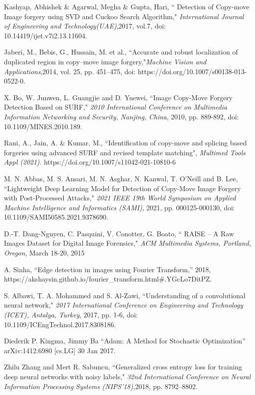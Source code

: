 \documentclass[conference]{IEEEtran}
\begin{document}
\begin{thebibliography}{00}
Kashyap, Abhishek \& Agarwal, Megha \& Gupta, Hari, “ Detection of Copy-move Image forgery using SVD and Cuckoo Search Algorithm," \textit{International Journal of Engineering and Technology(UAE)},2017, vol.7, doi: 10.14419/ijet.v7i2.13.11604. 

Jaberi, M., Bebis, G., Hussain, M. et al., “Accurate and robust localization of duplicated region in copy–move image forgery,"\textit{Machine Vision and Applications},2014, vol. 25, pp. 451–475, doi: https://doi.org/10.1007/s00138-013-0522-0.

X. Bo, W. Junwen, L. Guangjie and D. Yuewei, “Image Copy-Move Forgery Detection Based on SURF," \textit{2010 International Conference on Multimedia Information Networking and Security, Nanjing, China}, 2010, pp. 889-892, doi: 10.1109/MINES.2010.189.

Rani, A., Jain, A. \& Kumar, M., “Identification of copy-move and splicing based forgeries using advanced SURF and revised template matching",\textit{ Multimed Tools Appl (2021)}. https://doi.org/10.1007/s11042-021-10810-6

M. N. Abbas, M. S. Ansari, M. N. Asghar, N. Kanwal, T. O'Neill and B. Lee, “Lightweight Deep Learning Model for Detection of Copy-Move Image Forgery with Post-Processed Attacks," \textit{2021 IEEE 19th World Symposium on Applied Machine Intelligence and Informatics (SAMI)}, 2021, pp. 000125-000130, doi: 10.1109/SAMI50585.2021.9378690.

D.-T. Dang-Nguyen, C. Pasquini, V. Conotter, G. Boato, “ RAISE – A Raw Images Dataset for Digital Image Forensics,"\textit{ ACM Multimedia Systems, Portland, Oregon}, March 18-20, 2015

A. Sinha, “Edge detection in images using Fourier Transform,” 2018, https://akshaysin.github.io/fourier\_transform.html\#.YGcLo7DitPZ.

S. Albawi, T. A. Mohammed and S. Al-Zawi, “Understanding of a convolutional neural network," \textit{2017 International Conference on Engineering and Technology (ICET), Antalya, Turkey}, 2017, pp. 1-6, doi: 10.1109/ICEngTechnol.2017.8308186.

Diederik P. Kingma, Jimmy Ba “Adam: A Method for Stochastic Optimization” arXiv:1412.6980 [cs.LG] 30 Jan 2017.

Zhilu Zhang and Mert R. Sabuncu, “Generalized cross entropy loss for training deep neural networks with noisy labels," \textit{ 32nd International Conference on Neural Information Processing Systems (NIPS'18)},2018, pp. 8792–8802.


\end{thebibliography}
\end{document}
